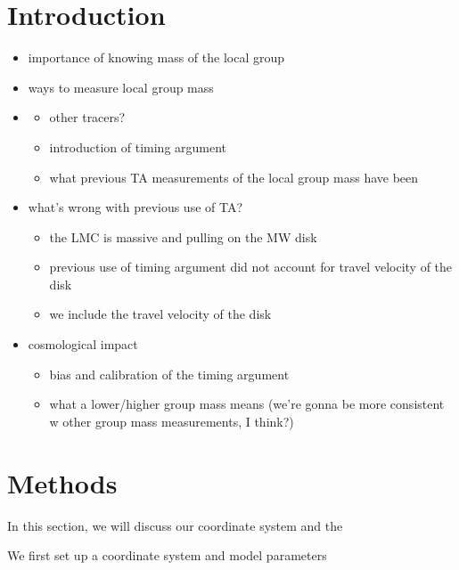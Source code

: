 \documentclass[twocolumn]{aastex631}
\begin{document}
\section{Introduction}
\label{sec:intro}

\begin{itemize}
    \item importance of knowing mass of the local group
    \item ways to measure local group mass
    \item \begin{itemize}
            \item other tracers? 
            \item introduction of timing argument 
            \item what previous TA measurements of the local group mass have been
          \end{itemize}
    \item what's wrong with previous use of TA?
        \begin{itemize}
            \item the LMC is massive and pulling on the MW disk
            \item previous use of timing argument did not account for travel velocity of the disk
            \item we include the travel velocity of the disk
        \end{itemize}
    \item cosmological impact
        \begin{itemize}
            \item bias and calibration of the timing argument 
            \item what a lower/higher group mass means (we're gonna be more consistent w other group mass measurements, I think?)
        \end{itemize}
    
\end{itemize}

\section{Methods}\label{sec:methods}
In this section, we will discuss our coordinate system and the 

We first set up a coordinate system and model parameters 
\end{document}
